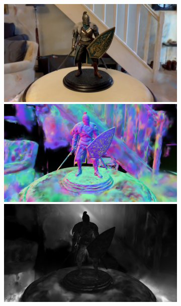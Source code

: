\begin{figure}[tb]
  \begin{subfigure}{0.155\linewidth}
  \includegraphics[width=\linewidth]{images/renders/faraam0_rgb_14.jpg}
  \includegraphics[width=\linewidth]{images/normals/faraam0_normals_14.jpg}
  \includegraphics[width=\linewidth]{images/frosting_size/faraam0_size_14.jpg}
  \end{subfigure}
  \hfill
  \begin{subfigure}{0.155\linewidth}

\end{subfigure}
\end{figure}
